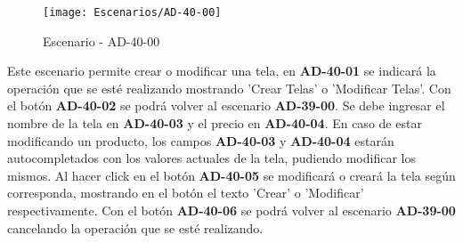 \begin{figure}[H]
\centering
\texttt{[image: Escenarios/AD-40-00]}
\caption{Escenario - AD-40-00}
\label{fig:AD-40-00}
\end{figure}

Este escenario permite crear o modificar una tela, en \textbf{AD-40-01} se indicará la operación que se esté realizando mostrando 'Crear Telas' o 'Modificar Telas'. Con el botón \textbf{AD-40-02} se podrá volver al escenario \textbf{AD-39-00}. Se debe ingresar el nombre de la tela en \textbf{AD-40-03} y el precio en \textbf{AD-40-04}. En caso de estar modificando un producto, los campos \textbf{AD-40-03} y \textbf{AD-40-04} estarán autocompletados con los valores actuales de la tela, pudiendo modificar los mismos. Al hacer click en el botón \textbf{AD-40-05} se modificará o creará la tela según corresponda, mostrando en el botón el texto 'Crear' o 'Modificar' respectivamente. Con el botón \textbf{AD-40-06} se podrá volver al escenario \textbf{AD-39-00} cancelando la operación que se esté realizando.
\clearpage
